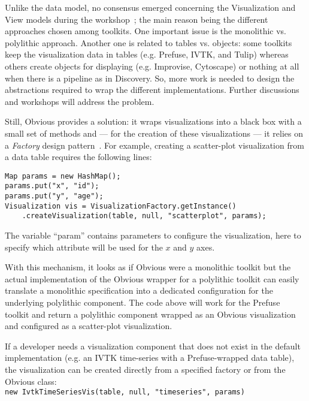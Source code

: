 \label{sec:viewvis}
Unlike the data model, no consensus emerged concerning the
Visualization and View models during the
workshop~\cite{vismaster2008}; the main reason being the different
approaches chosen among toolkits.  One important issue is the
monolithic vs. polylithic approach. Another one is related to tables
vs. objects: some toolkits keep the visualization data in tables
(e.g. Prefuse, IVTK, and Tulip) whereas others create
objects for displaying (e.g. Improvise, Cytoscape) or nothing at all
when there is a pipeline as in Discovery.  So, more work is needed to
design the abstractions required to wrap the different
implementations.  Further discussions and workshops will address the
problem.

Still, Obvious provides a solution: it wraps visualizations into a
black box with a small set of methods and --- for the creation of
these visualizations --- it relies on a \emph{Factory} design
pattern~\cite{DesignPatterns}.  For example, creating a scatter-plot
visualization from a data table requires the following lines:
\begin{lstlisting}
Map params = new HashMap();
params.put("x", "id");
params.put("y", "age");
Visualization vis = VisualizationFactory.getInstance()
    .createVisualization(table, null, "scatterplot", params);
\end{lstlisting}
The variable ``param'' contains parameters to configure the
visualization, here to specify which attribute will be used for the $x$
and $y$ axes.

With this mechanism, it looks as if Obvious were a monolithic toolkit
but the actual implementation of the Obvious wrapper for a polylithic
toolkit can easily translate a monolithic specification into a
dedicated configuration for the underlying polylithic component.  The
code above will work for the Prefuse toolkit and return a polylithic
component wrapped as an Obvious visualization and configured as a
scatter-plot visualization.

If a developer needs a visualization component that does not exist in
the default implementation (e.g. an IVTK time-series with a
Prefuse-wrapped data table), the visualization can be created directly
from a specified factory or from the Obvious class:\\
\lstinline!new IvtkTimeSeriesVis(table, null, "timeseries", params)!

